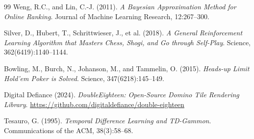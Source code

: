 \documentclass[11pt,letterpaper]{article}
\begin{document}
\begin{thebibliography}{99}
Weng, R.C., and Lin, C.-J. (2011).
\textit{A Bayesian Approximation Method for Online Ranking}.
Journal of Machine Learning Research, 12:267--300.

Silver, D., Hubert, T., Schrittwieser, J., et al. (2018).
\textit{A General Reinforcement Learning Algorithm that Masters Chess, Shogi, and Go through Self-Play}.
Science, 362(6419):1140--1144.

Bowling, M., Burch, N., Johanson, M., and Tammelin, O. (2015).
\textit{Heads-up Limit Hold'em Poker is Solved}.
Science, 347(6218):145--149.

Digital Defiance (2024).
\textit{DoubleEighteen: Open-Source Domino Tile Rendering Library}.
\url{https://github.com/digitaldefiance/double-eighteen}

Tesauro, G. (1995).
\textit{Temporal Difference Learning and TD-Gammon}.
Communications of the ACM, 38(3):58--68.


\end{thebibliography}
\end{document}
